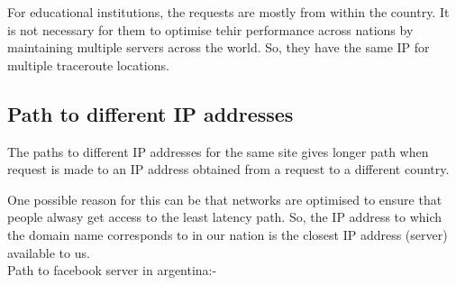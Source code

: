 \documentclass{article}
\begin{document}
For educational institutions, the requests are mostly from within the country. It is not necessary for them to optimise tehir 
performance across nations by maintaining multiple servers across the world. So, they have the same IP for multiple traceroute
locations.

\subsection*{ Path to different IP addresses}

The paths to different IP addresses for the same site gives longer path when request is made to an IP address obtained from a request 
to a different country. 

One possible reason for this can be that networks are optimised to ensure that people alwasy get access to the least latency path. So,
the IP address to which the domain name corresponds to in our nation is the closest IP address (server) available to us.\\

Path to facebook server in argentina:-
\end{document}
